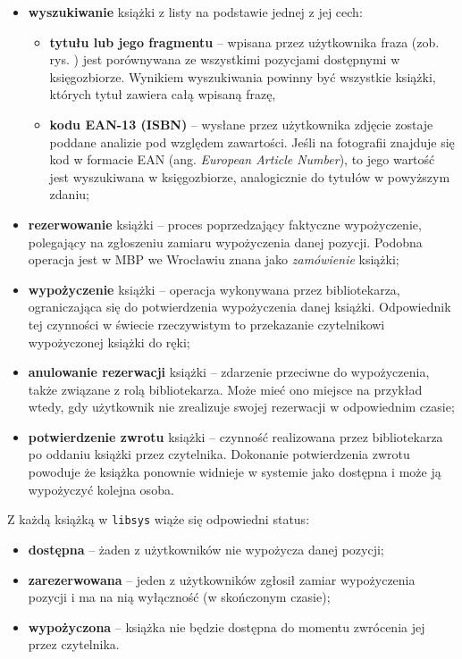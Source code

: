 \documentclass[12pt, a4paper]{article}
\begin{document}
\begin{itemize}
    \item \textbf{wyszukiwanie} książki z listy na podstawie jednej z jej cech:
    \begin{itemize}
        \item \textbf{tytułu lub jego fragmentu} -- wpisana przez użytkownika fraza (zob. rys. ) jest porównywana ze wszystkimi pozycjami dostępnymi w księgozbiorze. Wynikiem wyszukiwania powinny być wszystkie książki, których tytuł zawiera całą wpisaną frazę,
        \item \textbf{kodu EAN-13 (ISBN)} -- wysłane przez użytkownika zdjęcie zostaje poddane analizie pod względem zawartości. Jeśli na fotografii znajduje się kod w formacie EAN (ang. \textit{European Article Number}), to jego wartość jest wyszukiwana w księgozbiorze, analogicznie do tytułów w powyższym zdaniu;
    \end{itemize}
    \item \textbf{rezerwowanie} książki -- proces poprzedzający faktyczne wypożyczenie, polegający na zgłoszeniu zamiaru wypożyczenia danej pozycji. Podobna operacja jest w MBP we Wrocławiu znana jako \textit{zamówienie} książki;
    \item \textbf{wypożyczenie} książki -- operacja wykonywana przez bibliotekarza, ograniczająca się do potwierdzenia wypożyczenia danej książki. Odpowiednik tej czynności w świecie rzeczywistym to przekazanie czytelnikowi wypożyczonej książki do ręki;
    \item \textbf{anulowanie rezerwacji} książki -- zdarzenie przeciwne do wypożyczenia, także związane z rolą bibliotekarza. Może mieć ono miejsce na przykład wtedy, gdy użytkownik nie zrealizuje swojej rezerwacji w odpowiednim czasie;
    \item \textbf{potwierdzenie zwrotu} książki -- czynność realizowana przez bibliotekarza po oddaniu książki przez czytelnika. Dokonanie potwierdzenia zwrotu powoduje że książka ponownie widnieje w systemie jako dostępna i może ją wypożyczyć kolejna osoba. 
\end{itemize}

Z każdą książką w \texttt{libsys} wiąże się odpowiedni status:

\begin{itemize}
    \item \textbf{dostępna} -- żaden z użytkowników nie wypożycza danej pozycji;
    \item \textbf{zarezerwowana} -- jeden z użytkowników zgłosił zamiar wypożyczenia pozycji i ma na nią wyłączność (w skończonym czasie);
    \item \textbf{wypożyczona} -- książka nie będzie dostępna do momentu zwrócenia jej przez czytelnika.
\end{itemize}
\end{document}
